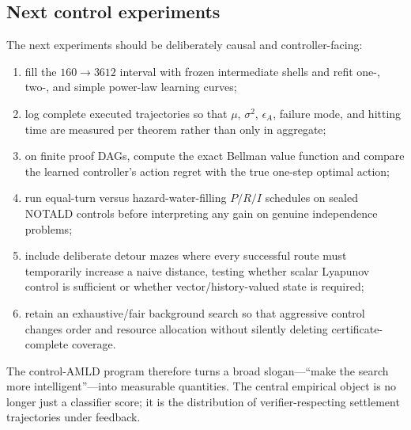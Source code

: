 \subsection{Next control experiments}
The next experiments should be deliberately causal and controller-facing:
\begin{enumerate}[label=(\roman*)]
\item fill the $160\to3612$ interval with frozen intermediate shells and refit one-, two-, and simple power-law learning curves;
\item log complete executed trajectories so that $\mu$, $\sigma^2$, $\epsilon_A$, failure mode, and hitting time are measured per theorem rather than only in aggregate;
\item on finite proof DAGs, compute the exact Bellman value function and compare the learned controller's action regret with the true one-step optimal action;
\item run equal-turn versus hazard-water-filling $P/R/I$ schedules on sealed NOTALD controls before interpreting any gain on genuine independence problems;
\item include deliberate detour mazes where every successful route must temporarily increase a naive distance, testing whether scalar Lyapunov control is sufficient or whether vector/history-valued state is required;
\item retain an exhaustive/fair background search so that aggressive control changes order and resource allocation without silently deleting certificate-complete coverage.
\end{enumerate}

The control-AMLD program therefore turns a broad slogan---``make the search more intelligent''---into measurable quantities. The central empirical object is no longer just a classifier score; it is the distribution of verifier-respecting settlement trajectories under feedback.
